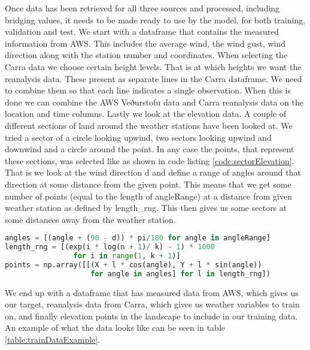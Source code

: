 Once data has been retrieved for all three sources and processed, including bridging values, it needs to be made ready to use by the model, for both training, validation and test. We start with a dataframe that contains the measured information from AWS. This includes the average wind, the wind gust, wind direction along with the station number and coordinates. When selecting the Carra data we choose certain height levels. That is at which heights we want the reanalysis data. These present as separate lines in the Carra dataframe. We need to combine them so that each line indicates a single observation. When this is done we can combine the AWS Veðurstofu data and Carra reanalysis data on the location and time columns. Lastly we look at the elevation data. A couple of different sections of land around the weather stations have been looked at. We tried a sector of a circle looking upwind, two sectors looking upwind and downwind and a circle around the point. In any case the points, that represent these sections, was selected like as shown in code listing \ref{code:sectorElevation}. That is we look at the wind direction d and define a range of angles around that direction at some distance from the given point. This means that we get some number of points (equal to the length of angleRange) at a distance from given weather station as defined by length\_rng. This then gives us some sectors at some distances away from the weather station.

\begin{lstlisting}[language = Python, caption = {Sector elevation points generated}, label = code:sectorElevation]
angles = [(angle + (90 - d)) * pi/180 for angle in angleRange]
length_rng = [(exp(i * log(n + 1)/ k) - 1) * 1000 
                for i in range(1, k + 1)]
points = np.array([[(X + l * cos(angle), Y + l * sin(angle))
                    for angle in angles] for l in length_rng])   
\end{lstlisting}

We end up with a dataframe that has measured data from AWS, which gives us our target, reanalysis data from Carra, which gives us weather variables to train on, and finally elevation points in the landscape to include in our training data. An example of what the data looks like can be seen in table \ref{table:trainDataExample}.

\begin{table}[h]
    \caption{An example of data structure used with model}
    \label{table:trainDataExample}
\end{table}

